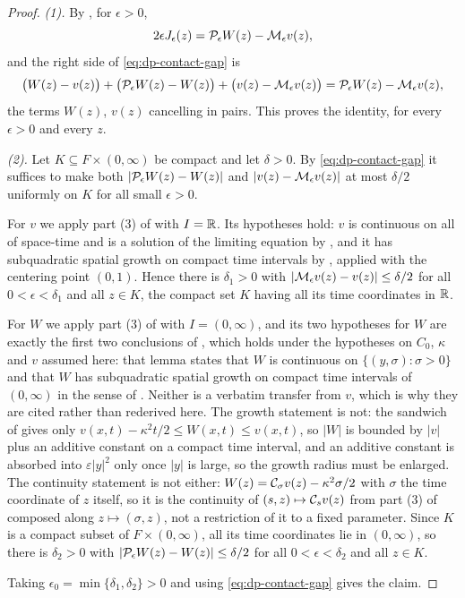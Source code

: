 \begin{proof}
\emph{(1).} By , for $\epsilon>0$,
\[
  2\epsilon J_\epsilon(z)
   =\mathcal{P}_\epsilon W(z)-\mathcal{M}_\epsilon v(z),
\]
and the right side of \eqref{eq:dp-contact-gap} is
\[
  \bigl(W(z)-v(z)\bigr)+\bigl(\mathcal{P}_\epsilon W(z)-W(z)\bigr)
     +\bigl(v(z)-\mathcal{M}_\epsilon v(z)\bigr)
  =\mathcal{P}_\epsilon W(z)-\mathcal{M}_\epsilon v(z),
\]
the terms $W(z)$, $v(z)$ cancelling in pairs. This proves the identity, for
every $\epsilon>0$ and every $z$.

\emph{(2).} Let $K\subseteq F\times(0,\infty)$ be compact and let $\delta>0$. By
\eqref{eq:dp-contact-gap} it suffices to make both
$|\mathcal{P}_\epsilon W(z)-W(z)|$ and $|v(z)-\mathcal{M}_\epsilon v(z)|$ at most
$\delta/2$ uniformly on $K$ for all small $\epsilon>0$.

For $v$ we apply part (3) of  with $I=\mathbb{R}$. Its
hypotheses hold: $v$ is continuous on all of space-time and is a solution of
the limiting equation by , and it has subquadratic spatial
growth on compact time intervals by , applied with
the centering point $(0,1)$. Hence there is $\delta_1>0$ with
$|\mathcal{M}_\epsilon v(z)-v(z)|\le\delta/2$ for all $0<\epsilon<\delta_1$ and all
$z\in K$, the compact set $K$ having all its time coordinates in $\mathbb{R}$.

For $W$ we apply part (3) of  with $I=(0,\infty)$, and
its two hypotheses for $W$ are exactly the first two conclusions of
, which holds under the hypotheses on
$C_0$, $\kappa$ and $v$ assumed here: that lemma states that $W$ is continuous on
$\{(y,\sigma):\sigma>0\}$ and that $W$ has subquadratic spatial growth on compact
time intervals of $(0,\infty)$ in the sense of .
Neither is a verbatim transfer from $v$, which is why they are cited rather than
rederived here. The growth statement is not: the sandwich of
 gives only $v(x,t)-\kappa^2t/2\le W(x,t)\le v(x,t)$, so
$|W|$ is bounded by $|v|$ plus an additive constant on a compact time interval, and
an additive constant is absorbed into $\varepsilon|y|^2$ only once $|y|$ is large,
so the growth radius must be enlarged. The continuity statement is not either:
$W(z)=\mathcal{C}_{\sigma}v(z)-\kappa^2\sigma/2$ with $\sigma$ the time coordinate of $z$
itself, so it is the continuity of $(s,z)\mapsto\mathcal{C}_sv(z)$ from part (3) of
 composed along $z\mapsto(\sigma,z)$, not a restriction of
it to a fixed parameter. Since $K$ is a compact subset of $F\times(0,\infty)$, all
its time coordinates lie in $(0,\infty)$, so there is $\delta_2>0$ with
$|\mathcal{P}_\epsilon W(z)-W(z)|\le\delta/2$ for all $0<\epsilon<\delta_2$ and all
$z\in K$.

Taking $\epsilon_0=\min\{\delta_1,\delta_2\}>0$ and using
\eqref{eq:dp-contact-gap} gives the claim.
\end{proof}
